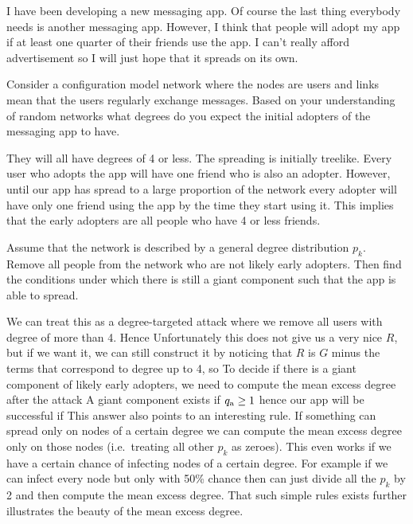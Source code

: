 
I have been developing a new messaging app. Of course the last thing everybody needs is another messaging app. However, I think that people will adopt my app if at least one quarter of their friends use the app. I can't really afford advertisement so I will just hope that it spreads on its own. 

\subquestion 
Consider a configuration model network where the nodes are users and links mean that the users regularly exchange messages. Based on your understanding of random networks what degrees do you expect the initial adopters of the messaging app to have. 

\solution 
They will all have degrees of 4 or less. The spreading is initially treelike. Every user who adopts the app will have one friend who is also an adopter. However, until our app has spread to a large proportion of the network every adopter will have only one friend using the app by the time they start using it. This implies that the early adopters are all people who have 4 or less friends. 

\subquestion
Assume that the network is described by a general degree distribution $p_k$.
Remove all people from the network who are not likely early adopters. Then find the conditions under which there is still a giant component such that the app is able to spread. 

\solution We can treat this as a degree-targeted attack where we remove all users with degree of more than 4. Hence 
Unfortunately this does not give us a very nice $R$, but if we want it, we can still construct it by noticing that $R$ is $G$ minus the terms that correspond to degree up to 4, so 
To decide if there is a giant component of likely early adopters, we need to compute the mean excess degree after the attack
A giant component exists if $q_{\rm a}\geq 1$ hence our app will be successful if 
This answer also points to an interesting rule. If something can spread only on nodes of a certain degree we can compute the mean excess degree only on those nodes (i.e.~treating all other $p_k$ as zeroes). This even works if we have a certain chance of infecting nodes of a certain degree. For example if we can infect every node but only with 50\% chance then can just divide all the $p_k$ by 2 and then compute the mean excess degree. That such simple rules exists further illustrates the beauty of the mean excess degree. 

